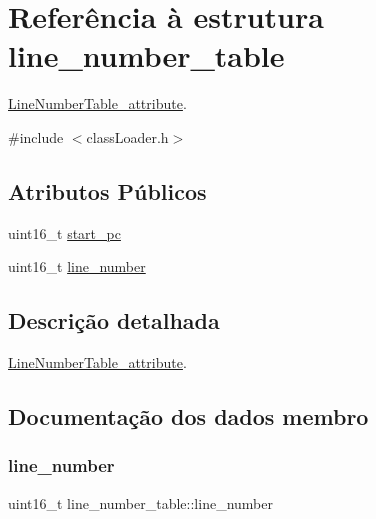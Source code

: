 \hypertarget{structline__number__table}{}\section{Referência à estrutura line\+\_\+number\+\_\+table}
\label{structline__number__table}


\hyperlink{struct_line_number_table__attribute}{Line\+Number\+Table\+\_\+attribute}.  




{\ttfamily \#include $<$class\+Loader.\+h$>$}

\subsection*{Atributos Públicos}
\begin{DoxyCompactItemize}
\item 
uint16\+\_\+t \hyperlink{structline__number__table_aa02a29c6b279bbf7c13188bac7bb516e}{start\+\_\+pc}
\item 
uint16\+\_\+t \hyperlink{structline__number__table_a89808614aa6da0682bdd84aa82c6eadc}{line\+\_\+number}
\end{DoxyCompactItemize}


\subsection{Descrição detalhada}
\hyperlink{struct_line_number_table__attribute}{Line\+Number\+Table\+\_\+attribute}. 

\subsection{Documentação dos dados membro}
\hypertarget{structline__number__table_a89808614aa6da0682bdd84aa82c6eadc}{}\label{structline__number__table_a89808614aa6da0682bdd84aa82c6eadc} 
\subsubsection{\texorpdfstring{line\+\_\+number}{line\_number}}
{\footnotesize\ttfamily uint16\+\_\+t line\+\_\+number\+\_\+table\+::line\+\_\+number}

\hypertarget{structline__number__table_aa02a29c6b279bbf7c13188bac7bb516e}{}\label{structline__number__table_aa02a29c6b279bbf7c13188bac7bb516e} 
